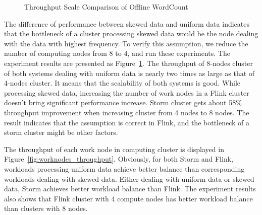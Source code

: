 \begin{figure}[t!]
\begin{center}
   \caption{Throughput Scale Comparison of Offline WordCount}
   \label{fig:offline_throughput_scale}
  \end{center}
\end{figure}

The difference of performance between skewed data and uniform data indicates that the bottleneck of a cluster processing skewed data would be the node dealing with the data with highest frequency. To verify this assumption, we reduce the number of computing nodes from 8 to 4, and run these experiments. The experiment results are presented as Figure~\ref{fig:offline_throughput_scale}. The throughput of 8-nodes cluster of both systems dealing with uniform data is nearly two times as large as that of 4-nodes cluster. It means that the scalability of both systems is good. While processing skewed data, increasing the number of work nodes in a Flink cluster doesn't bring significant performance increase. Storm cluster gets about 58\% throughput improvement when increasing cluster from 4 nodes to 8 nodes. The result indicates that the assumption is correct in Flink, and the bottleneck of a storm cluster might be other factors.

The throughput of each work node in computing cluster is displayed in Figure~\ref{fig:worknodes_throughput}. Obviously, for both Storm and Flink, workloads processing uniform data achieve better balance than corresponding workloads dealing with skewed data. Either dealing with uniform data or skewed data, Storm achieves better workload balance than Flink. The experiment results also shows that Flink cluster with 4 compute nodes has better workload balance than clusters with 8 nodes.



